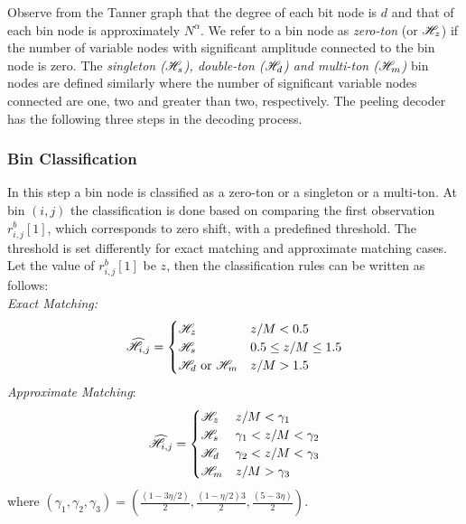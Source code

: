 \begin{enumerate}
	Observe from the Tanner graph that the degree of each bit node is $d$ and that of each bin node is approximately $N^{\alpha}$. 
We refer to a bin node as {\it zero-ton} (or $\mathscr{H}_z$) if the number of variable nodes with significant amplitude connected to the bin node is zero. The {\it singleton ($\mathscr{H}_s$), double-ton ($\mathscr{H}_d$) and multi-ton ($\mathscr{H}_m$)} bin nodes are defined similarly where the number of significant variable nodes connected are one, two and greater than two, respectively. The peeling decoder has the following three steps in the decoding process.\\

\subsubsection{Bin Classification} In this step a bin node is classified as a zero-ton or a singleton or a multi-ton. At bin $(i,j)$ the classification is done based on  comparing the first observation $r^{b}_{i,j}[1]$, which corresponds to zero shift, with a predefined threshold. The threshold is set differently for exact matching and approximate matching cases. Let the value of $r^{b}_{i,j}[1]$ be $z$, then the classification rules can be written as follows:\\
{\it Exact Matching:} 
\begin{align}
\label{Eqn:BinClassifExact}
\widehat{\mathscr{H}}_{i,j}=
\begin{cases}
\mathscr{H}_z &  		z/M < 0.5 \\
\mathscr{H}_s &	 0.5 \leq z/M \leq 1.5 \\ 
\mathscr{H}_d \text{ or } \mathscr{H}_m  &       z/M > 1.5
\end{cases}
\end{align}
\textit{Approximate Matching}: 
\begin{align}
\label{Eqn:BinClassifApprox}
\widehat{\mathscr{H}}_{i,j}=
\begin{cases}
\mathscr{H}_z &  	 z/M < \gamma_1\\
\mathscr{H}_s &	  \gamma_1 < z/M < \gamma_2  \\
\mathscr{H}_d  &    \gamma_2  < z/M <  \gamma_3\\ 
\mathscr{H}_m &      z/M > \gamma_3\\
\end{cases}
\end{align}
where $(\gamma_1,\gamma_2,\gamma_3)=(\frac{(1-3\eta/2)}{2},\frac{(1-\eta/2)3}{2},\frac{(5-3\eta)}{2})$.
			   

\end{enumerate}
